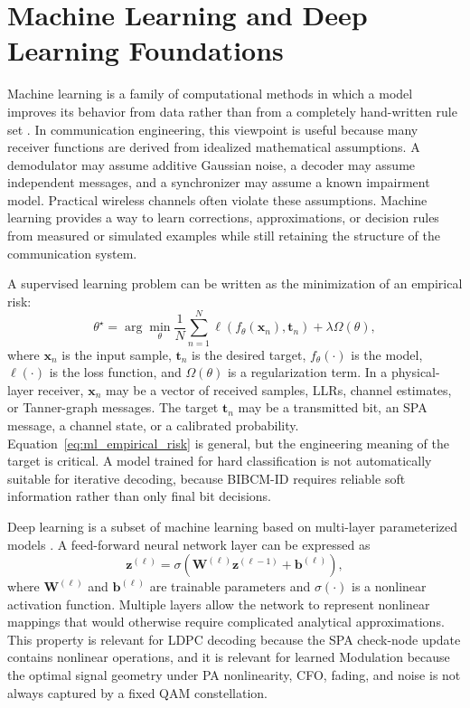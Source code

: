 \section{Machine Learning and Deep Learning Foundations}
Machine learning is a family of computational methods in which a model improves its behavior from data rather than from a completely hand-written rule set \cite{bishop2006}. In communication engineering, this viewpoint is useful because many receiver functions are derived from idealized mathematical assumptions. A demodulator may assume additive Gaussian noise, a decoder may assume independent messages, and a synchronizer may assume a known impairment model. Practical wireless channels often violate these assumptions. Machine learning provides a way to learn corrections, approximations, or decision rules from measured or simulated examples while still retaining the structure of the communication system.

A supervised learning problem can be written as the minimization of an empirical risk:
\begin{equation}
\label{eq:ml_empirical_risk}
\theta^\star=\arg\min_{\theta}\frac{1}{N}\sum_{n=1}^{N}
\ell\!\left(f_{\theta}(\mathbf{x}_n),\mathbf{t}_n\right)
+\lambda\Omega(\theta),
\end{equation}
where $\mathbf{x}_n$ is the input sample, $\mathbf{t}_n$ is the desired target, $f_{\theta}(\cdot)$ is the model, $\ell(\cdot)$ is the loss function, and $\Omega(\theta)$ is a regularization term. In a physical-layer receiver, $\mathbf{x}_n$ may be a vector of received samples, LLRs, channel estimates, or Tanner-graph messages. The target $\mathbf{t}_n$ may be a transmitted bit, an SPA message, a channel state, or a calibrated probability. Equation~\eqref{eq:ml_empirical_risk} is general, but the engineering meaning of the target is critical. A model trained for hard classification is not automatically suitable for iterative decoding, because BIBCM-ID requires reliable soft information rather than only final bit decisions.

Deep learning is a subset of machine learning based on multi-layer parameterized models \cite{lecun2015,goodfellow2016}. A feed-forward neural network layer can be expressed as
\begin{equation}
\label{eq:nn_layer_ch1}
\mathbf{z}^{(\ell)}=\sigma\!\left(\mathbf{W}^{(\ell)}\mathbf{z}^{(\ell-1)}+\mathbf{b}^{(\ell)}\right),
\end{equation}
where $\mathbf{W}^{(\ell)}$ and $\mathbf{b}^{(\ell)}$ are trainable parameters and $\sigma(\cdot)$ is a nonlinear activation function. Multiple layers allow the network to represent nonlinear mappings that would otherwise require complicated analytical approximations. This property is relevant for LDPC decoding because the SPA check-node update contains nonlinear operations, and it is relevant for learned Modulation because the optimal signal geometry under PA nonlinearity, CFO, fading, and noise is not always captured by a fixed QAM constellation.

